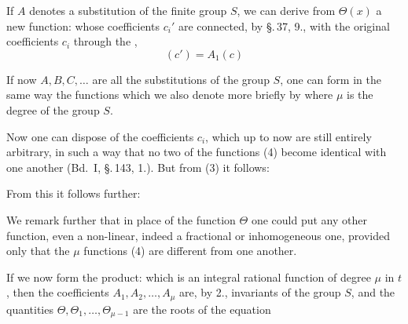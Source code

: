 If $A$ denotes a substitution of the finite group $S$, we
can derive from $\Theta(x)$ a new function:
whose coefficients $c_i'$ are connected, by \S.\,37, 9., with the original
coefficients $c_i$ through the ,
\[ (c') = A_1(c) \]

If now $A, B, C, \dots$ are all the substitutions of the
group $S$, one can form in the same way the functions
which we also denote more briefly by
where $\mu$ is the degree of the group $S$.

Now one can dispose of the coefficients $c_i$, which up to now
are still entirely arbitrary, in such a way that no two of the functions
(4) become identical with one another (Bd.\ I, \S.\,143, 1.).
But from (3) it follows:


From this it follows further:


We remark further that in place of the function $\Theta$
one could put any other function, even a non-linear, indeed a fractional
or inhomogeneous one, provided only that the $\mu$ functions
(4) are different from one another.

If we now form the product:
which is an integral rational function of degree $\mu$ in $t$, then
the coefficients $A_1, A_2, \dots, A_\mu$ are, by 2., invariants of the
group $S$, and the quantities $\Theta, \Theta_1, \dots, \Theta_{\mu-1}$ are the roots
of the equation
